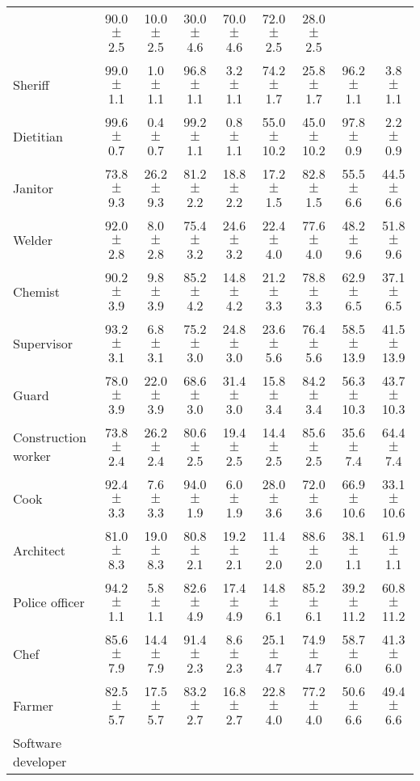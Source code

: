 \begin{table*}[p]
{\begin{tabular}{l|cc|cc|cc|cc}
& 90.0 $\pm$ 2.5 & 10.0 $\pm$ 2.5
& 30.0 $\pm$ 4.6 & 70.0 $\pm$ 4.6
& 72.0 $\pm$ 2.5 & 28.0 $\pm$ 2.5
\\
Sheriff
& 99.0 $\pm$ 1.1 & 1.0 $\pm$ 1.1
& 96.8 $\pm$ 1.1 & 3.2 $\pm$ 1.1
& 74.2 $\pm$ 1.7 & 25.8 $\pm$ 1.7
& 96.2 $\pm$ 1.1 & 3.8 $\pm$ 1.1
\\
Dietitian
& 99.6 $\pm$ 0.7 & 0.4 $\pm$ 0.7
& 99.2 $\pm$ 1.1 & 0.8 $\pm$ 1.1
& 55.0 $\pm$ 10.2 & 45.0 $\pm$ 10.2
& 97.8 $\pm$ 0.9 & 2.2 $\pm$ 0.9
\\
Janitor
& 73.8 $\pm$ 9.3 & 26.2 $\pm$ 9.3
& 81.2 $\pm$ 2.2 & 18.8 $\pm$ 2.2
& 17.2 $\pm$ 1.5 & 82.8 $\pm$ 1.5
& 55.5 $\pm$ 6.6 & 44.5 $\pm$ 6.6
\\
Welder
& 92.0 $\pm$ 2.8 & 8.0 $\pm$ 2.8
& 75.4 $\pm$ 3.2 & 24.6 $\pm$ 3.2
& 22.4 $\pm$ 4.0 & 77.6 $\pm$ 4.0
& 48.2 $\pm$ 9.6 & 51.8 $\pm$ 9.6
\\
Chemist
& 90.2 $\pm$ 3.9 & 9.8 $\pm$ 3.9
& 85.2 $\pm$ 4.2 & 14.8 $\pm$ 4.2
& 21.2 $\pm$ 3.3 & 78.8 $\pm$ 3.3
& 62.9 $\pm$ 6.5 & 37.1 $\pm$ 6.5
\\
Supervisor
& 93.2 $\pm$ 3.1 & 6.8 $\pm$ 3.1
& 75.2 $\pm$ 3.0 & 24.8 $\pm$ 3.0
& 23.6 $\pm$ 5.6 & 76.4 $\pm$ 5.6
& 58.5 $\pm$ 13.9 & 41.5 $\pm$ 13.9
\\
Guard
& 78.0 $\pm$ 3.9 & 22.0 $\pm$ 3.9
& 68.6 $\pm$ 3.0 & 31.4 $\pm$ 3.0
& 15.8 $\pm$ 3.4 & 84.2 $\pm$ 3.4
& 56.3 $\pm$ 10.3 & 43.7 $\pm$ 10.3
\\
Construction worker
& 73.8 $\pm$ 2.4 & 26.2 $\pm$ 2.4
& 80.6 $\pm$ 2.5 & 19.4 $\pm$ 2.5
& 14.4 $\pm$ 2.5 & 85.6 $\pm$ 2.5
& 35.6 $\pm$ 7.4 & 64.4 $\pm$ 7.4
\\
Cook
& 92.4 $\pm$ 3.3 & 7.6 $\pm$ 3.3
& 94.0 $\pm$ 1.9 & 6.0 $\pm$ 1.9
& 28.0 $\pm$ 3.6 & 72.0 $\pm$ 3.6
& 66.9 $\pm$ 10.6 & 33.1 $\pm$ 10.6
\\
Architect
& 81.0 $\pm$ 8.3 & 19.0 $\pm$ 8.3
& 80.8 $\pm$ 2.1 & 19.2 $\pm$ 2.1
& 11.4 $\pm$ 2.0 & 88.6 $\pm$ 2.0
& 38.1 $\pm$ 1.1 & 61.9 $\pm$ 1.1
\\
Police officer
& 94.2 $\pm$ 1.1 & 5.8 $\pm$ 1.1
& 82.6 $\pm$ 4.9 & 17.4 $\pm$ 4.9
& 14.8 $\pm$ 6.1 & 85.2 $\pm$ 6.1
& 39.2 $\pm$ 11.2 & 60.8 $\pm$ 11.2
\\
Chef
& 85.6 $\pm$ 7.9 & 14.4 $\pm$ 7.9
& 91.4 $\pm$ 2.3 & 8.6 $\pm$ 2.3
& 25.1 $\pm$ 4.7 & 74.9 $\pm$ 4.7
& 58.7 $\pm$ 6.0 & 41.3 $\pm$ 6.0
\\
Farmer
& 82.5 $\pm$ 5.7 & 17.5 $\pm$ 5.7
& 83.2 $\pm$ 2.7 & 16.8 $\pm$ 2.7
& 22.8 $\pm$ 4.0 & 77.2 $\pm$ 4.0
& 50.6 $\pm$ 6.6 & 49.4 $\pm$ 6.6
\\
Software developer

\end{tabular}}
\end{table*}
